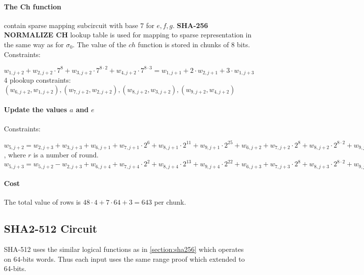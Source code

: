 \paragraph{The Ch function}
contain sparse mapping subcircuit with base $7$ for $e, f ,g$.
\textbf{SHA-256 NORMALIZE CH} lookup table is used for mapping to sparse representation in the same way as for $\sigma_0$.
The value of the $ ch $ function is stored in chunks of $8$ bits.
Constraints:
\begin{center}
    $w_{1, j + 2} + w_{2, j + 2} \cdot 7^8 + w_{3, j + 2} \cdot 7^{8 \cdot 2} + w_{4, j + 2} \cdot 7^{8 \cdot 3} = w_{1, j + 1} + 2 \cdot w_{2, j + 1} + 3 \cdot w_{1, j + 3}$ \\
    4 plookup constraints: $( w_{6, j + 2}, w_{1, j + 2}), ( w_{7, j + 2}, w_{2, j + 2}), (w_{8, j + 2}, w_{3, j + 2}), (w_{9, j + 2}, w_{4, j + 2})$ \\
\end{center}

\paragraph{Update the values $a$ and $e$}
Constraints:
\begin{center}
    $w_{5, j + 2} = w_{2, j + 3} + w_{3, j + 3} + w_{6, j + 1} + w_{7, j + 1} \cdot 2^6 + w_{8, j + 1} \cdot  2^{11} + w_{9, j + 1} \cdot 2^{25} + w_{6, j + 2} + w_{7, j + 2} \cdot 2^8 + w_{8, j + 2} \cdot 2^{8 \cdot 2} + w_{9, j + 2} \cdot 2^{8 \cdot 3} + k[r] + w_{4, j + 3}$, where $r$ is a number of round. \\
    $w_{5, j + 3} = w_{5, j + 2} - w_{2, j + 3} + w_{6, j + 4} + w_{7, j + 4} \cdot 2^2 + w_{8, j + 4} \cdot  2^{13} + w_{9, j + 4} \cdot 2^{22} + w_{6, j + 3} + w_{7, j + 3} \cdot 2^8 + w_{8, j + 3} \cdot 2^{8 \cdot 2} + w_{9, j + 3} \cdot 2^{8 \cdot 3}$
\end{center}

\paragraph{Cost}
The total value of rows is $48 \cdot 4 + 7 \cdot 64 + 3 = 643$ per chunk.

\subsection{SHA2-512 Circuit}
\label{section:sha512}
SHA-512 uses the similar logical functions as in \ref{section:sha256} which operates on $64$-bits words.
Thus each input uses the same range proof which extended to 64-bits.

